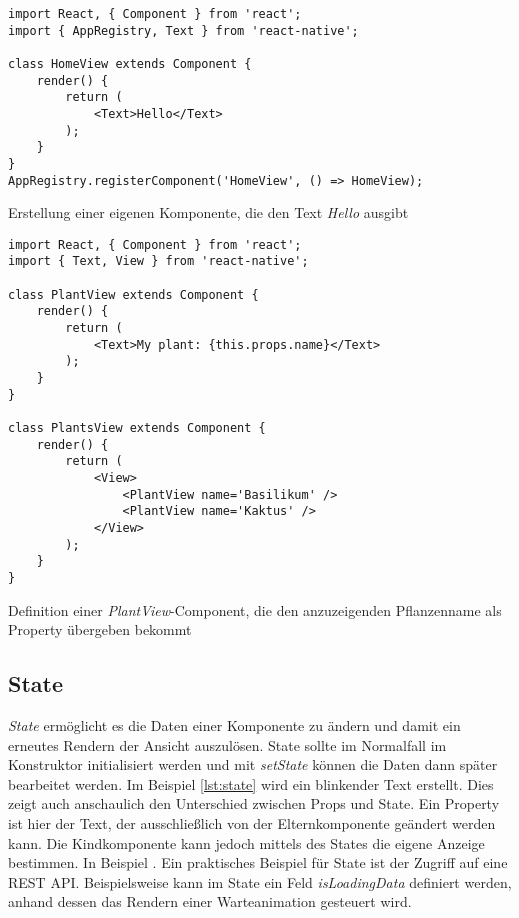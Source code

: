 \begin{listing}[H]
    \begin{verbatim}
import React, { Component } from 'react';
import { AppRegistry, Text } from 'react-native';

class HomeView extends Component {
    render() {
        return (
            <Text>Hello</Text>
        );
    }
}
AppRegistry.registerComponent('HomeView', () => HomeView);
    \end{verbatim}
    \caption{Erstellung einer eigenen Komponente, die den Text \textit{Hello} ausgibt}
    \label{lst:component}
\end{listing}
\begin{listing}[H]
    \begin{verbatim}
import React, { Component } from 'react';
import { Text, View } from 'react-native';

class PlantView extends Component {
    render() {
        return (
            <Text>My plant: {this.props.name}</Text>
        );
    }
}

class PlantsView extends Component {
    render() {
        return (
            <View>
                <PlantView name='Basilikum' />
                <PlantView name='Kaktus' />
            </View>
        );
    }
}

    \end{verbatim}
    \caption{Definition einer \textit{PlantView}-Component, die den anzuzeigenden Pflanzenname als Property übergeben bekommt}
    \label{lst:props}
\end{listing}

\subsection{State}
\textit{State} ermöglicht es die Daten einer Komponente zu ändern und damit ein erneutes Rendern der Ansicht auszulösen. State sollte im Normalfall im Konstruktor initialisiert werden und mit \textit{setState} können die Daten dann später bearbeitet werden. Im Beispiel \ref{lst:state} wird ein blinkender Text erstellt. Dies zeigt auch anschaulich den Unterschied zwischen Props und State. Ein Property ist hier der Text, der ausschließlich von der Elternkomponente geändert werden kann. Die Kindkomponente kann jedoch mittels des States die eigene Anzeige bestimmen. In Beispiel \cite{facebook_inc._state_2017}. Ein praktisches Beispiel für State ist der Zugriff auf eine REST API. Beispielsweise kann im State ein Feld \textit{isLoadingData} definiert werden, anhand dessen das Rendern einer Warteanimation gesteuert wird.

